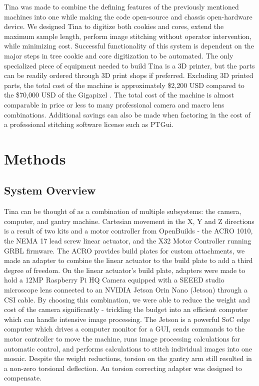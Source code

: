 \documentclass[a4paper,12pt]{article}
\begin{document}
Tina was made to combine the defining features of the previously mentioned machines into one while making the code open-source and chassis open-hardware device. 
We designed Tina to digitize both cookies and cores, extend the maximum sample length, perform image stitching without operator intervention, while minimizing cost. 
Successful functionality of this system is dependent on the major steps in tree cookie and core digitization to be automated. 
The only specialized piece of equipment needed to build Tina is a 3D printer, but the parts can be readily ordered through 3D print shops if preferred.
Excluding 3D printed parts, the total cost of the machine is approximately \$2,200 USD compared to the \$70,000 USD of the Gigapixel \citep{griffin_gigapixel_2021}.
The total cost of the machine is almost comparable in price or less to many professional camera and macro lens combinations.
Additional savings can also be made when factoring in the cost of a professional stitching software license such as PTGui. 

\section{Methods}

\subsection{System Overview} %

Tina can be thought of as a combination of multiple subsystems: the camera, computer, and gantry machine. 
Cartesian movement in the X, Y and Z directions is a result of two kits and a motor controller from OpenBuilds - the ACRO 1010, the NEMA 17 lead screw linear actuator, and the X32 Motor Controller running GRBL firmware. 
The ACRO provides build plates for custom attachments, we made an adapter to combine the linear actuator to the build plate to add a third degree of freedom.
On the linear actuator's build plate, adapters were made to hold a 12MP Raspberry Pi HQ Camera equipped with a SEEED studio microscope lens connected to an NVIDIA Jetson Orin Nano (Jetson) through a CSI cable.
By choosing this combination, we were able to reduce the weight and cost of the camera significantly - trickling the budget into an efficient computer which can handle intensive image processing. 
The Jetson is a powerful SoC edge computer which drives a computer monitor for a GUI, sends commands to the motor controller to move the machine, runs image processing calculations for automatic control, and performs calculations to stitch individual images into one mosaic. 
Despite the weight reductions, torsion on the gantry arm still resulted in a non-zero torsional deflection. An torsion correcting adapter was designed to compensate.
\end{document}
